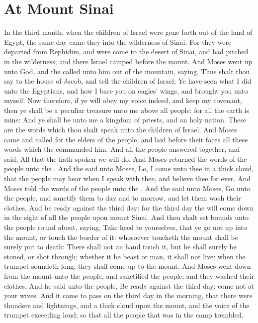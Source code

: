 \section*{At Mount Sinai}
\begin{biblechapter} %
\verse In the third month, when the children of Israel were gone forth out of the land of Egypt, the same day came they into the wilderness of Sinai.
\verse For they were departed from Rephidim, and were come to the desert of Sinai, and had pitched in the wilderness; and there Israel camped before the mount.
\verse And Moses went up unto God, and the \LORD called unto him out of the mountain, saying, Thus shalt thou say to the house of Jacob, and tell the children of Israel;
\verse Ye have seen what I did unto the Egyptians, and how I bare you on eagles' wings, and brought you unto myself.
\verse Now therefore, if ye will obey my voice indeed, and keep my covenant, then ye shall be a peculiar treasure unto me above all people: for all the earth is mine:
\verse And ye shall be unto me a kingdom of priests, and an holy nation. These are the words which thou shalt speak unto the children of Israel.
\verse And Moses came and called for the elders of the people, and laid before their faces all these words which the \LORD commanded him.
\verse And all the people answered together, and said, All that the \LORD hath spoken we will do. And Moses returned the words of the people unto the \LORD.
\verse And the \LORD said unto Moses, Lo, I come unto thee in a thick cloud, that the people may hear when I speak with thee, and believe thee for ever. And Moses told the words of the people unto the \LORD.
\verse And the \LORD said unto Moses, Go unto the people, and sanctify them to day and to morrow, and let them wash their clothes,
\verse And be ready against the third day: for the third day the \LORD will come down in the sight of all the people upon mount Sinai.
\verse And thou shalt set bounds unto the people round about, saying, Take heed to yourselves, that ye go not up into the mount, or touch the border of it: whosoever toucheth the mount shall be surely put to death:
\verse There shall not an hand touch it, but he shall surely be stoned, or shot through; whether it be beast or man, it shall not live: when the trumpet soundeth long, they shall come up to the mount.
\verse And Moses went down from the mount unto the people, and sanctified the people; and they washed their clothes.
\verse And he said unto the people, Be ready against the third day: come not at your wives.
\verse And it came to pass on the third day in the morning, that there were thunders and lightnings, and a thick cloud upon the mount, and the voice of the trumpet exceeding loud; so that all the people that was in the camp trembled.

\end{biblechapter}

